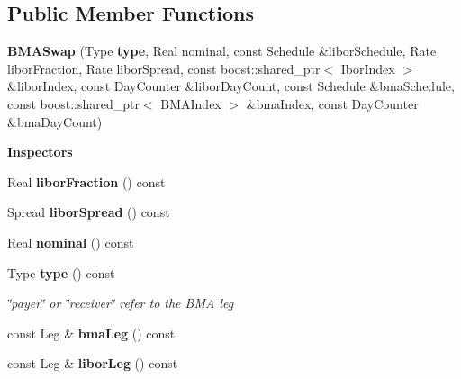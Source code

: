 \subsection*{Public Member Functions}
\begin{DoxyCompactItemize}
\item 
{\bfseries B\+M\+A\+Swap} (Type {\bf type}, Real nominal, const Schedule \&libor\+Schedule, Rate libor\+Fraction, Rate libor\+Spread, const boost\+::shared\+\_\+ptr$<$ Ibor\+Index $>$ \&libor\+Index, const Day\+Counter \&libor\+Day\+Count, const Schedule \&bma\+Schedule, const boost\+::shared\+\_\+ptr$<$ B\+M\+A\+Index $>$ \&bma\+Index, const Day\+Counter \&bma\+Day\+Count)\label{class_quant_lib_1_1_b_m_a_swap_a79008d168c4555ac595d77cee96c6387}

\end{DoxyCompactItemize}
\begin{Indent}{\bf Inspectors}\par
\begin{DoxyCompactItemize}
\item 
Real {\bfseries libor\+Fraction} () const \label{class_quant_lib_1_1_b_m_a_swap_a485bba7adc04021dbac53b59eb6af31f}

\item 
Spread {\bfseries libor\+Spread} () const \label{class_quant_lib_1_1_b_m_a_swap_aab2ddf3bd77429bfa4e5de4ceb5a0bac}

\item 
Real {\bfseries nominal} () const \label{class_quant_lib_1_1_b_m_a_swap_abf8134aab4861addd1a361654dadec48}

\item 
Type {\bf type} () const \label{class_quant_lib_1_1_b_m_a_swap_aa6e28f2f11e4491c9f0013a0b7dee77e}

\begin{DoxyCompactList}\small\item\em \char`\"{}payer\char`\"{} or \char`\"{}receiver\char`\"{} refer to the B\+MA leg \end{DoxyCompactList}\item 
const Leg \& {\bfseries bma\+Leg} () const \label{class_quant_lib_1_1_b_m_a_swap_aa38de0f1efc3b0840bae32df8e4b8708}

\item 
const Leg \& {\bfseries libor\+Leg} () const \label{class_quant_lib_1_1_b_m_a_swap_a355a3571f71e7856131b4633f3bbfbde}

\end{DoxyCompactItemize}
\end{Indent}
